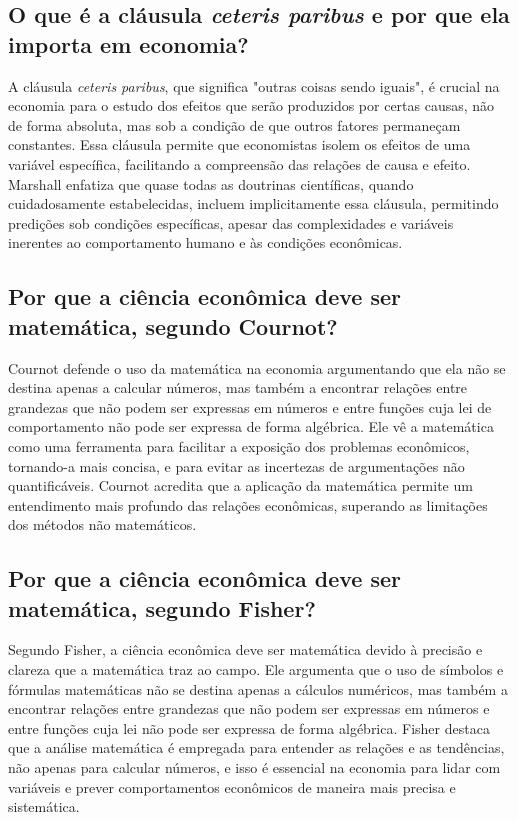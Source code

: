 \documentclass[a4paper,12pt]{article}[abntex2]
\begin{document}
\subsection{\textbf{O que é a cláusula \textit{ceteris paribus} e por que ela importa em economia?}}
A cláusula \textit{ceteris paribus}, que significa "outras coisas sendo iguais", é crucial na economia para o estudo dos efeitos que serão produzidos por certas causas, não de forma absoluta, mas sob a condição de que outros fatores permaneçam constantes. Essa cláusula permite que economistas isolem os efeitos de uma variável específica, facilitando a compreensão das relações de causa e efeito. Marshall enfatiza que quase todas as doutrinas científicas, quando cuidadosamente estabelecidas, incluem implicitamente essa cláusula, permitindo predições sob condições específicas, apesar das complexidades e variáveis inerentes ao comportamento humano e às condições econômicas.
\subsection{\textbf{Por que a ciência econômica deve ser matemática, segundo Cournot?}}
Cournot defende o uso da matemática na economia argumentando que ela não se destina apenas a calcular números, mas também a encontrar relações entre grandezas que não podem ser expressas em números e entre funções cuja lei de comportamento não pode ser expressa de forma algébrica. Ele vê a matemática como uma ferramenta para facilitar a exposição dos problemas econômicos, tornando-a mais concisa, e para evitar as incertezas de argumentações não quantificáveis. Cournot acredita que a aplicação da matemática permite um entendimento mais profundo das relações econômicas, superando as limitações dos métodos não matemáticos.
\subsection{\textbf{Por que a ciência econômica deve ser matemática, segundo Fisher?}}
Segundo Fisher, a ciência econômica deve ser matemática devido à precisão e clareza que a matemática traz ao campo. Ele argumenta que o uso de símbolos e fórmulas matemáticas não se destina apenas a cálculos numéricos, mas também a encontrar relações entre grandezas que não podem ser expressas em números e entre funções cuja lei não pode ser expressa de forma algébrica. Fisher destaca que a análise matemática é empregada para entender as relações e as tendências, não apenas para calcular números, e isso é essencial na economia para lidar com variáveis e prever comportamentos econômicos de maneira mais precisa e sistemática.
\end{document}
